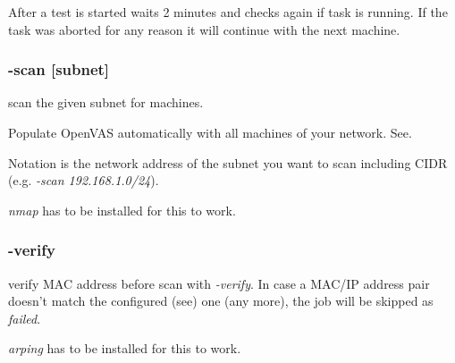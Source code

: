 After a test is started \sw waits 2 minutes and checks again if task is running. If the task was aborted for any reason it will continue with the next machine.

\breakpoint\subsubsection*{-scan [subnet]} scan the given subnet for machines.

Populate OpenVAS automatically with all machines of your network. See.

Notation is the network address of the subnet you want to scan including CIDR (e.g. \emph{-scan 192.168.1.0/24}).

\warn \emph{nmap} has to be installed for this to work.

\breakpoint\subsubsection*{-verify}\label{sec:verifymac} verify MAC address before scan with \emph{-verify}.
In case a MAC/IP address pair doesn't match the configured (see) one (any more), the job will be skipped as \emph{failed}.

\warn \emph{arping} has to be installed for this to work.
